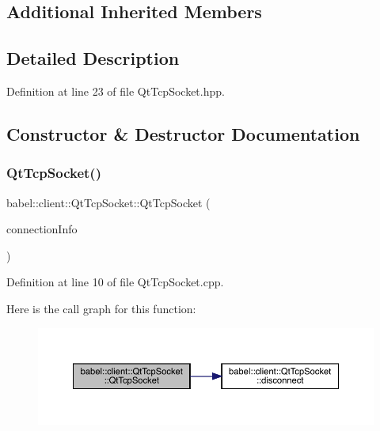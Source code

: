 \subsection*{Additional Inherited Members}


\subsection{Detailed Description}


Definition at line 23 of file Qt\+Tcp\+Socket.\+hpp.



\subsection{Constructor \& Destructor Documentation}
\mbox{\label{classbabel_1_1client_1_1_qt_tcp_socket_a04823a8dc4692ac9ff6c0ba1c40db7ac}} 
\subsubsection{\texorpdfstring{Qt\+Tcp\+Socket()}{QtTcpSocket()}}
{\footnotesize\ttfamily babel\+::client\+::\+Qt\+Tcp\+Socket\+::\+Qt\+Tcp\+Socket (\begin{DoxyParamCaption}\item[{\mbox{\hyperlink{classbabel_1_1common_1_1_connection_info}{common\+::\+Connection\+Info}} \&}]{connection\+Info }\end{DoxyParamCaption})\hspace{0.3cm}{\ttfamily [explicit]}}



Definition at line 10 of file Qt\+Tcp\+Socket.\+cpp.

Here is the call graph for this function\+:\nopagebreak
\begin{figure}[H]
\begin{center}
\leavevmode
\includegraphics[width=350pt]{classbabel_1_1client_1_1_qt_tcp_socket_a04823a8dc4692ac9ff6c0ba1c40db7ac_cgraph}
\end{center}
\end{figure}


